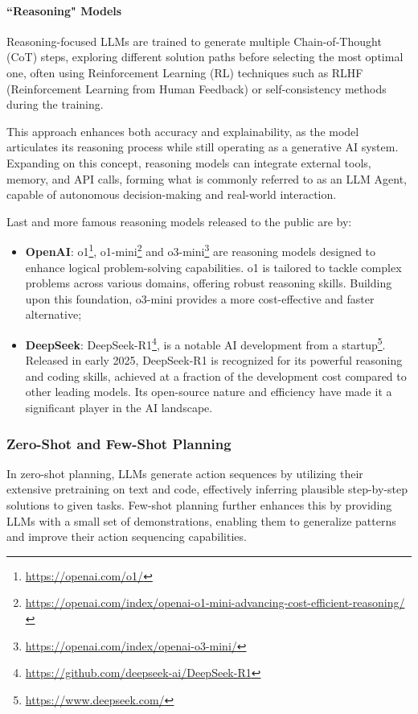 \paragraph{``Reasoning" Models}
Reasoning-focused LLMs are trained to generate multiple Chain-of-Thought (CoT) steps,
exploring different solution paths before selecting the most optimal one, often using
Reinforcement Learning (RL) \cite{deepseekai2025deepseekr1incentivizingreasoningcapability}
techniques such as RLHF (Reinforcement Learning from Human Feedback) or self-consistency
methods during the training.

This approach enhances both accuracy and explainability, as the model
articulates its reasoning process while still operating as a generative AI
system. Expanding on this concept, reasoning models can integrate external tools,
memory, and API calls, forming what is commonly referred to as an LLM Agent,
capable of autonomous decision-making and real-world interaction.

Last and more famous reasoning models released to the public are by:
\begin{itemize}
  \item \textbf{OpenAI}: o1\footnote{\url{https://openai.com/o1/}}, o1-mini\footnote{\url{https://openai.com/index/openai-o1-mini-advancing-cost-efficient-reasoning/}}
    and o3-mini\footnote{\url{https://openai.com/index/openai-o3-mini/}} are reasoning
    models designed to enhance logical problem-solving capabilities. o1 is
    tailored to tackle complex problems across various domains, offering robust reasoning
    skills. Building upon this foundation, o3-mini provides a more cost-effective
    and faster alternative;

  \item \textbf{DeepSeek}: DeepSeek-R1\footnote{\url{https://github.com/deepseek-ai/DeepSeek-R1}},
    is a notable AI development from a startup\footnote{\url{https://www.deepseek.com/}}.
    Released in early 2025, DeepSeek-R1 is recognized for its powerful reasoning
    and coding skills, achieved at a fraction of the development cost compared to
    other leading models. Its open-source nature and efficiency have made it a
    significant player in the AI landscape.
\end{itemize}

\subsubsection{Zero-Shot and Few-Shot Planning}
In zero-shot planning, LLMs generate action sequences by utilizing their extensive
pretraining on text and code, effectively inferring plausible step-by-step
solutions to given tasks. Few-shot planning further enhances this by providing LLMs
with a small set of demonstrations, enabling them to generalize patterns and
improve their action sequencing capabilities.

